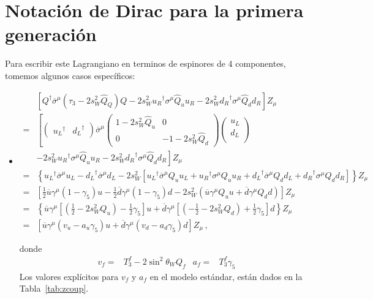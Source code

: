 \section{Notación de Dirac para la primera generación}
Para escribir este Lagrangiano en terminos de espinores de 4 componentes, tomemos algunos casos específicos:
\begin{itemize}
\item
  \begin{align}
\label{eq:zf4}
    &\left[ Q^{\dagger}\overline{\sigma}^\mu\left( \tau_3-2s_W^2\widehat{Q}_Q\right)Q
      -2s_W^2{u_R}^{\dagger}\sigma^\mu\widehat{Q}_u u_R-2s_W^2{d_R}^{\dagger}\sigma^\mu\widehat{Q}_d d_R\right]Z_\mu\nonumber\\
=&\left[\begin{pmatrix}
      {u_L}^{\dagger} &{d_L}^{\dagger}
    \end{pmatrix}\overline{\sigma}^\mu
    \begin{pmatrix}
      1-2s_W^2\widehat{Q}_u & 0\\
      0 &-1-2s_W^2\widehat{Q}_d
    \end{pmatrix}
    \begin{pmatrix}
      u_L\\
      d_L\\
    \end{pmatrix}\right.\nonumber\\
    &\left.-2s_W^2{u_R}^{\dagger}\sigma^\mu\widehat{Q}_u u_R-2s_W^2{d_R}^{\dagger}\sigma^\mu\widehat{Q}_d d_R
  \right]Z_\mu\nonumber\\
    =&\left\{{u_L}^{\dagger}\overline{\sigma}^\mu u_L-{d_L}^{\dagger}\overline{\sigma}^\mu d_L
-2s_W^2\left[{u_L}^{\dagger}\overline{\sigma}^{\mu}Q_u u_L+{u_R}^{\dagger}\sigma^\mu Q_uu_R
+{d_L}^{\dagger}\overline{\sigma}^{\mu}Q_d d_L+{d_R}^{\dagger}\sigma^\mu Q_dd_R
\right]\right\}Z_\mu \nonumber\\
          =&\left[\frac{1}{2}\overline{u}\gamma^\mu(1-\gamma_5)u-\frac{1}{2}\overline{d}\gamma^\mu(1-\gamma_5)d
-2s_W^2\left(\overline{u}\gamma^\mu Q_u u
+\overline{d}\gamma^\mu Q_d d
\right)\right]Z_\mu\nonumber\\
        =&\left\{\overline{u}\gamma^\mu\left[\left(\frac{1}{2}-2s_W^2Q_u\right)-\frac{1}{2}\gamma_5\right]u+
\overline{d}\gamma^\mu\left[\left(-\frac{1}{2}-2s_W^2Q_d\right)+\frac{1}{2}\gamma_5\right]d
\right\}Z_\mu\nonumber\\
  =&\left[\overline{u}\gamma^\mu\left(v_u-a_u\gamma_5\right)u+\overline{d}\gamma^\mu\left(v_d-a_d\gamma_5\right)d\right]Z_\mu\,,
\end{align}

donde
\begin{align}
\label{eq:vfaf}
  v_f=&T_3^f-2 \sin^2\theta_WQ_f & a_f=&T_3^f \gamma_5
\end{align}
Los valores explícitos para  $v_f$ y $a_f$ en el modelo estándar, están dados en la Tabla~\ref{tab:zcoup}. 
\end{itemize}


